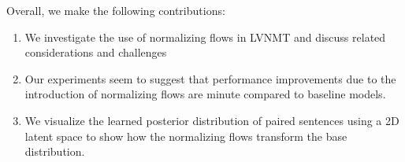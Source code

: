 
Overall, we make the following contributions:
\begin{enumerate}
	\item We investigate the use of normalizing flows in \ac{LVNMT} and discuss related considerations and challenges
	
	\item Our experiments seem to suggest that performance improvements due to the introduction of normalizing flows are minute compared to baseline models. 
	
	\item We visualize the learned posterior distribution of paired sentences using a 2D latent space to show how the normalizing flows transform the base distribution.
\end{enumerate}



